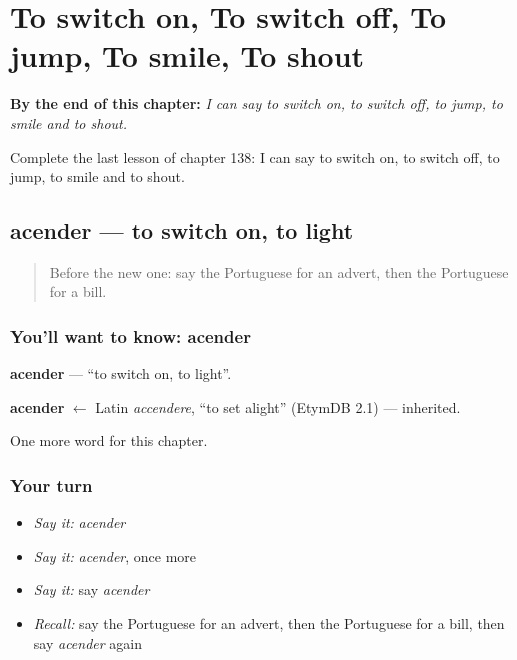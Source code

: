 
\chapter{To switch on, To switch off, To jump, To smile, To shout}
\label{ch:pt-to-switch-on-to-switch-off-to-jump-to-smile-to-shout}

\begin{chapteropening}
\textbf{By the end of this chapter:} \emph{I can say to switch on, to switch off, to jump, to smile and to shout.}

Complete the last lesson of chapter 138: I can say to switch on, to switch off, to jump, to smile and to shout.
\end{chapteropening}

\section[acender]{acender — to switch on, to light}

\label{lesson:PT-C138-acender}



\begin{quote}
Before the new one: say the Portuguese for an advert, then the Portuguese for a bill.
\end{quote}

\subsection*{You'll want to know: acender}
\textbf{acender} — \textquotedblleft{}to switch on, to light\textquotedblright{}.

\begin{cousinweb}
\textbf{acender} $\leftarrow$ Latin \emph{accendere}, \textquotedblleft{}to set alight\textquotedblright{} (EtymDB 2.1) — inherited.
\end{cousinweb}

\begin{grammarlens}[title={What you've built}]
One more word for this chapter.
\end{grammarlens}

\subsection*{Your turn}
\begin{itemize}
\raggedright
  \item \emph{Say it:} \emph{acender}
  \item \emph{Say it:} \emph{acender}, once more
  \item \emph{Say it:} say \emph{acender}
  \item \emph{Recall:} say the Portuguese for an advert, then the Portuguese for a bill, then say \emph{acender} again
\end{itemize}

